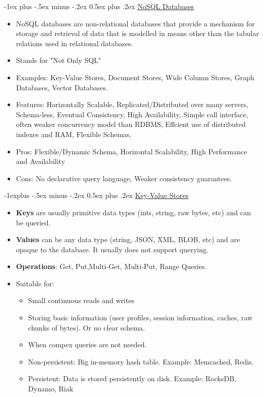 \documentclass[10pt, landscape]{article}
\makeatletter
\renewcommand{\section}{\@startsection{section}{1}{0mm}%
  {-1ex plus -.5ex minus -.2ex}%
  {0.5ex plus .2ex}%
{\normalfont\large\bfseries}}
\renewcommand{\subsection}{\@startsection{subsection}{2}{0mm}%
  {-1explus -.5ex minus -.2ex}%
  {0.5ex plus .2ex}%
{\normalfont\normalsize\bfseries}}
\makeatother
\begin{document}
\begin{multicols*}{4}
  \section{\underline{NoSQL Databases}}

  \begin{itemize}
    \item NoSQL databases are non-relational databases that provide a mechanism for storage and retrieval of data that is modelled in means other than the tabular relations used in relational databases.
    \item Stands for "Not Only SQL"
    \item Examples: Key-Value Stores, Document Stores, Wide Column Stores, Graph Databases, Vector Databases.
    \item Features: Horizontally Scalable, Replicated/Distributed over many servers, Schema-less, Eventual Consistency, High Availability, Simple call interface, often weaker concurrency model than RDBMS, Effcient use of distributed indexes and RAM, Flexible Schemas.
    \item Pros: Flexible/Dynamic Schema, Horizontal Scalability, High Performance and Availability
    \item Cons: No declarative query language, Weaker consistency guarantees.
  \end{itemize}

  \subsection{\underline{Key-Value Stores}}
  \begin{itemize}
    \item \textbf{Keys} are usually primitive data types (ints, string, raw bytes, etc) and can be queried.
    \item \textbf{Values} can be any data type (string, JSON, XML, BLOB, etc) and are opaque to the database. It usually does not support querying.
    \item \textbf{Operations}: Get, Put,Multi-Get, Multi-Put, Range Queries.
    \item Suitable for:
    \begin{itemize}
      \item Small continuous reads and writes
      \item Storing basic information (user profiles, session information, caches, raw chunks of bytes). Or no clear schema.
      \item When compex queries are not needed.
      \item Non-persistent: Big in-memory hash table. Example: Memcached, Redis.
      \item Persistent: Data is stored persistently on disk. Example: RocksDB, Dynamo, Riak
    \end{itemize}
  \end{itemize}


\end{multicols*}
\end{document}
